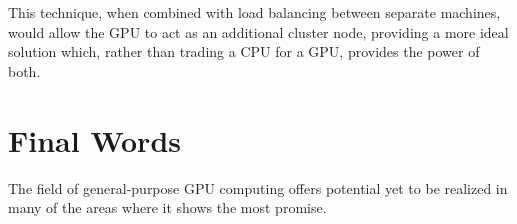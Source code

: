 This technique, when combined with load balancing between separate machines, would allow the GPU to act as an additional cluster node, providing a more ideal solution which, rather than trading a CPU for a GPU, provides the power of both. 


\section{Final Words}

The field of general-purpose GPU computing offers potential yet to be realized in many of the areas where it shows the most promise. 


